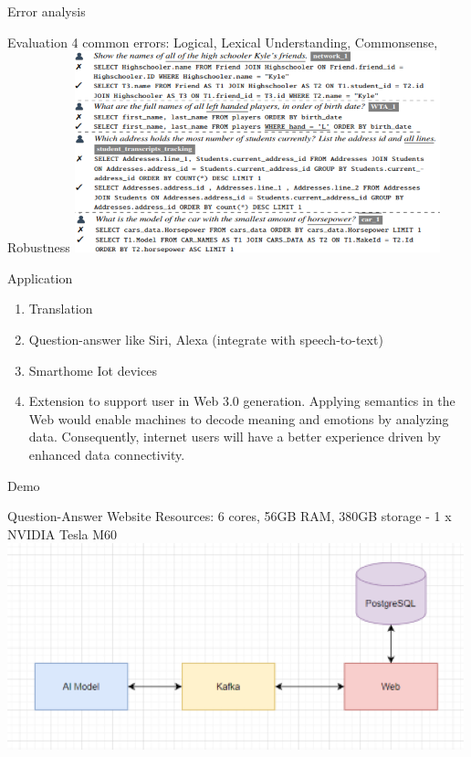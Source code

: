 \documentclass{beamer}
\begin{document}
\begin{frame}[t]{Error analysis}\vspace{10pt}
\begin{block}{Evaluation}
4 common errors: Logical, Lexical Understanding, Commonsense, Robustness
\includegraphics{error2}
\end{block}
\end{frame}

\begin{frame}[t]{Application}\vspace{10pt}
\begin{enumerate}
\item Translation
\pause
\item Question-answer like Siri, Alexa (integrate with speech-to-text)
\pause
\item Smarthome Iot devices
\pause
\item Extension to support user in Web 3.0 generation. Applying semantics in the Web would enable machines to decode meaning and emotions by analyzing data. Consequently, internet users will have a better experience driven by enhanced data connectivity.
\end{enumerate}
\end{frame}


\begin{frame}[t]{Demo}\vspace{10pt}
\begin{block}{Question-Answer Website}
Resources: 6 cores, 56GB RAM, 380GB storage - 1 x NVIDIA Tesla M60
\includegraphics{demo}
\end{block}
\end{frame}
\end{document}
